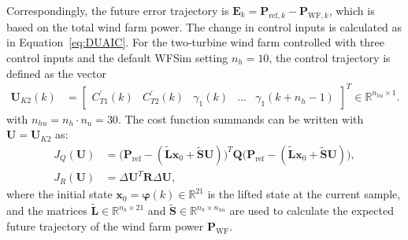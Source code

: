 Correspondingly, the future error trajectory is $\bm{E}_k = \bm{P}_{\text{ref},k} - \bm{P}_{\text{WF},k}$, which is based on the total wind farm power. The change in control inputs is calculated as in Equation~\eqref{eq:DUAIC}.
%
For the two-turbine wind farm controlled with three control inputs and the default WFSim setting $n_h = 10$, the control trajectory is defined as the vector
\begin{align*} 
    \bm{U}_{K2}(k) &= \begin{bmatrix} 
        C_{T1}^\prime(k) & C_{T2}^\prime(k) & \gamma_1(k) & \dots & \gamma_1(k+n_h-1) 
    \end{bmatrix}^T \in \mathbb{R}^{n_{hu} \times 1}.
\end{align*}
with $n_{hu} = n_h\cdot n_u = 30$. The cost function summands can be written with $\bm{U} = \bm{U}_{K2}$ as:
\begin{align*} 
    J_Q (\bm{U}) &= \big(\bm{P}_{\text{ref}} - (\tilde{\bm{L}} \bm{x}_0 + \tilde{\bm{S}} \bm{U})\big)^T \bm{Q} \big(\bm{P}_{\text{ref}} - (\tilde{\bm{L}} \bm{x}_0 + \tilde{\bm{S}} \bm{U})\big),\\
    J_R (\bm{U}) &= \Delta \bm{U}^T \bm{R} \Delta \bm{U},
\end{align*}
where the initial state $\bm{x}_0 = \bm{\varphi}(k) \in \mathbb{R}^{21}$ is the lifted state at the current sample, and the matrices $\tilde{\bm{L}} \in \mathbb{R}^{n_h \times 21}$ and $\tilde{\bm{S}} \in \mathbb{R}^{n_h \times n_{hu}}$ are used to calculate the expected future trajectory of the wind farm power $\bm{P}_{\text{WF}}$.

